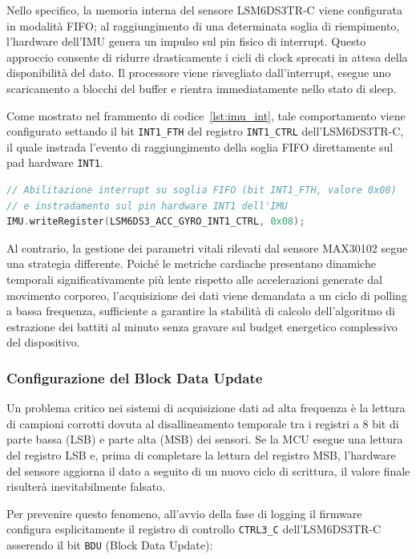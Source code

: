 Nello specifico, la memoria interna del sensore LSM6DS3TR-C viene configurata in modalità FIFO; al raggiungimento di una determinata soglia di riempimento, l'hardware dell'IMU genera un impulso sul pin fisico di interrupt.
Questo approccio consente di ridurre drasticamente i cicli di clock sprecati in attesa della disponibilità del dato.
Il processore viene risvegliato dall'interrupt, esegue uno scaricamento a blocchi del buffer e rientra immediatamente nello stato di sleep.

Come mostrato nel frammento di codice~\ref{lst:imu_int}, tale comportamento viene configurato settando il bit \texttt{INT1\_FTH} del registro \texttt{INT1\_CTRL} dell'LSM6DS3TR-C, il quale instrada l'evento di raggiungimento della soglia FIFO direttamente sul pad hardware \texttt{INT1}.

\begin{lstlisting}[language=C++, caption={Configurazione del registro di controllo interrupt per l'unità inerziale.}, label=lst:imu_int]
// Abilitazione interrupt su soglia FIFO (bit INT1_FTH, valore 0x08) 
// e instradamento sul pin hardware INT1 dell'IMU
IMU.writeRegister(LSM6DS3_ACC_GYRO_INT1_CTRL, 0x08);
\end{lstlisting}

Al contrario, la gestione dei parametri vitali rilevati dal sensore MAX30102 segue una strategia differente. Poiché le metriche cardiache presentano dinamiche temporali significativamente più lente rispetto alle accelerazioni generate dal movimento corporeo, l'acquisizione dei dati viene demandata a un ciclo di polling a bassa frequenza, sufficiente a garantire la stabilità di calcolo dell'algoritmo di estrazione dei battiti al minuto senza gravare sul budget energetico complessivo del dispositivo.

\subsubsection{Configurazione del Block Data Update}
Un problema critico nei sistemi di acquisizione dati ad alta frequenza è la lettura di campioni corrotti dovuta al disallineamento temporale tra i registri a 8 bit di parte bassa (LSB) e parte alta (MSB) dei sensori.
Se la MCU esegue una lettura del registro LSB e, prima di completare la lettura del registro MSB, l'hardware del sensore aggiorna il dato a seguito di un nuovo ciclo di scrittura, il valore finale risulterà inevitabilmente falsato.

Per prevenire questo fenomeno, all'avvio della fase di logging il firmware configura esplicitamente il registro di controllo \texttt{CTRL3\_C} dell'LSM6DS3TR-C asserendo il bit \texttt{BDU} (Block Data Update):

